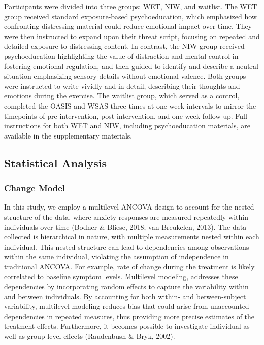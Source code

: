 \documentclass[
  man,floatsintext]{apa7}
\begin{document}
Participants were divided into three groups: WET, NIW, and waitlist.
The WET group received standard exposure-based psychoeducation, which emphasized how confronting distressing material could reduce emotional impact over time.
They were then instructed to expand upon their threat script, focusing on repeated and detailed exposure to distressing content.
In contrast, the NIW group received psychoeducation highlighting the value of distraction and mental control in fostering emotional regulation,
and then guided to identify and describe a neutral situation emphasizing sensory details without emotional valence.
Both groups were instructed to write vividly and in detail, describing their thoughts and emotions during the exercise.
The waitlist group, which served as a control, completed the OASIS and WSAS three times at one-week intervals to mirror the timepoints of pre-intervention, post-intervention, and one-week follow-up.
Full instructions for both WET and NIW, including psychoeducation materials, are available in the supplementary materials.

\subsection{Statistical Analysis}\label{statistical-analysis}

\subsubsection{Change Model}\label{change-model}

In this study, we employ a multilevel ANCOVA design to account for the nested structure of the data, where anxiety responses are measured repeatedly within individuals over time (Bodner \& Bliese, 2018; van Breukelen, 2013).
The data collected is hierarchical in nature, with multiple measurements nested within each individual.
This nested structure can lead to dependencies among observations within the same individual, violating the assumption of independence in traditional ANCOVA.
For example, rate of change during the treatment is likely correlated to baseline symptom levels.
Multilevel modeling, addresses these dependencies by incorporating random effects to capture the variability within and between individuals.
By accounting for both within- and between-subject variability, multilevel modeling reduces bias that could arise from unaccounted dependencies in repeated measures, thus providing more precise estimates of the treatment effects.
Furthermore, it becomes possible to investigate individual as well as group level effects (Raudenbush \& Bryk, 2002).
\end{document}
